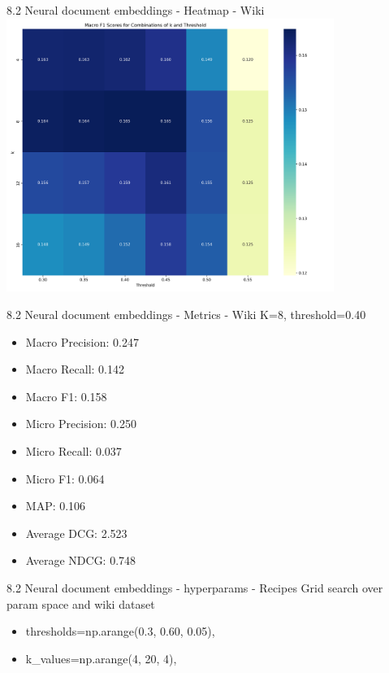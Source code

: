 \documentclass{beamer}
\begin{document}
\begin{frame}{8.2 Neural document embeddings - Heatmap - Wiki}
  \centering
  \includegraphics[width=0.8\textwidth]{wiki_embeddings_heatmap.png_1747347453.png}
\end{frame}


\begin{frame}{8.2 Neural document embeddings - Metrics - Wiki}
  K=8, threshold=0.40
  \begin{itemize}
    \item Macro Precision: 0.247
    \item Macro Recall: 0.142
    \item Macro F1: 0.158
    \item Micro Precision: 0.250
    \item Micro Recall: 0.037
    \item Micro F1: 0.064
    \item MAP: 0.106
    \item Average DCG: 2.523
    \item Average NDCG: 0.748
  \end{itemize}
\end{frame}

\begin{frame}{8.2 Neural document embeddings - hyperparams - Recipes}
  Grid search over param space and wiki dataset
  \begin{itemize}
    \item thresholds=np.arange(0.3, 0.60, 0.05),
    \item k\_values=np.arange(4, 20, 4),
  \end{itemize}
\end{frame}
\end{document}
